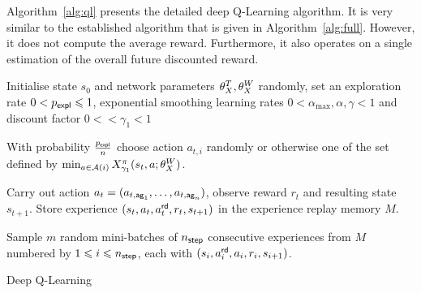 \documentclass[envcountsame]{llncs}
\begin{document}
Algorithm~\ref{alg:ql} presents the detailed deep Q-Learning algorithm. It is very similar to the
established \ARA{} algorithm that is given in Algorithm~\ref{alg:full}. However, it does not compute
the average reward. Furthermore, it also operates on a single estimation of the overall future
discounted reward.

\begin{algorithm}[h!]
  \begin{algorithmic}[1]
    \State{}Initialise state \(s_{0}\) and network parameters \(\theta_X^{T}, \theta_X^{W}\) randomly,
    set an exploration rate \(0 < p_{\mathsf{expl}} \leqslant 1\), exponential smoothing learning rates
    \(0 < \alpha_{\max}, \alpha, \gamma < 1\) and discount factor \(0 < < \gamma_{1} < 1\)
      \State{}%
    \begin{minipage}[t]{\dimexpr\textwidth-\leftmargin-\labelsep-\labelwidth-\leftmargin+2pt}
      With probability \(\frac{p_{\mathsf{expl}}}{n}\) choose action \(a_{t,i}\) randomly or otherwise one of
      the set defined by
      \(\min_{a \in \mathcal{A}(i)}X^{\pi}_{\gamma_{1}}(s_{t},a; \theta_X^{W}{})\).
    \end{minipage}
    \EndFor{}
    \State{}%
    \begin{minipage}[t]{\dimexpr\textwidth-\leftmargin-\labelsep-\labelwidth}
      Carry out action \(a_{t}=(a_{t,\mathsf{ag}_{1}},\ldots,a_{t,\mathsf{ag}_{n}})\), observe reward
      \(r_{t}\) and resulting state \(s_{t+1}\). Store experience
      \((s_{t}, a_{t}, a_{t}^{\mathsf{rd}}, r_{t}, s_{t+1})\) in the experience replay memory \(M\).
    \end{minipage}
    \State{}%
    \begin{minipage}[t]{\dimexpr\textwidth-\leftmargin-\labelsep-\labelwidth-\leftmargin+2pt}
      Sample \(m\) random mini-batches of \(n_{\mathsf{step}}\) consecutive experiences from \(M\) numbered by
      \(1 \leqslant i \leqslant n_{\mathsf{step}}\), each with
      \((s_{i}, a_{i}^{\mathsf{rd}}, a_{i}, r_{i}, s_{i+1})\).
    \end{minipage}
    \EndIf
    \EndFor{}
    \EndFor{}
    \EndIf{}
    \EndWhile{}
  \end{algorithmic}
  \caption{\label{alg:ql}Deep Q-Learning}
\end{algorithm}
\end{document}

